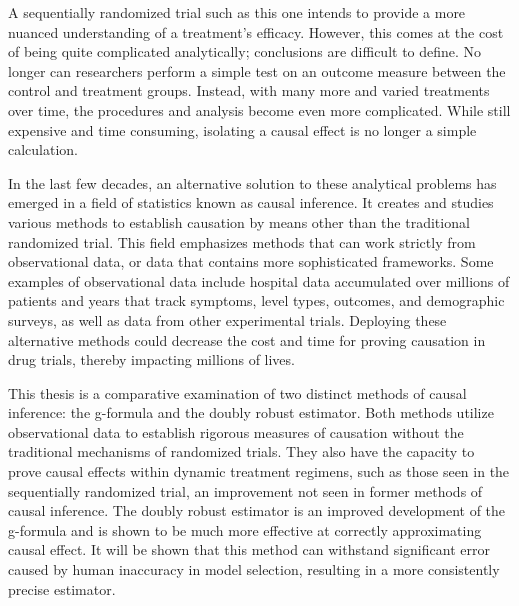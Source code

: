A sequentially randomized trial such as this one intends to provide a more nuanced understanding of a treatment's efficacy.  However, this comes at the cost of being quite complicated analytically; conclusions are difficult to define.  No longer can researchers perform a simple test on an outcome measure between the control and treatment groups.  Instead, with many more and varied treatments over time, the procedures and analysis become even more complicated.  While still expensive and time consuming, isolating a causal effect is no longer a simple calculation.  
 
In the last few decades, an alternative solution to these analytical problems has emerged in a field of statistics known as causal inference.  It creates and studies various methods to establish causation by means other than the traditional randomized trial.  This field emphasizes methods that can work strictly from observational data, or data that contains more sophisticated frameworks.  Some examples of observational data include hospital data accumulated over millions of patients and years that track symptoms, level types, outcomes, and demographic surveys, as well as data from other experimental trials.  Deploying these alternative methods could decrease the cost and time for proving causation in drug trials, thereby impacting millions of lives.  

This thesis is a comparative examination of two distinct methods of causal inference: the g-formula and the doubly robust estimator.  Both methods utilize observational data to establish rigorous measures of causation without the traditional mechanisms of randomized trials.  They also have the capacity to prove causal effects within dynamic treatment regimens, such as those seen in the sequentially randomized trial, an improvement not seen in former methods of causal inference.  The doubly robust estimator is an improved development of the g-formula and is shown to be much more effective at correctly approximating causal effect.  It will be shown that this method can withstand significant error caused by human inaccuracy in model selection, resulting in a more consistently precise estimator.  

